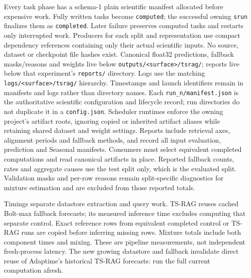 \documentclass[11pt,a4paper]{article}
\begin{document}
Every task phase has a schema-1 plain scientific manifest allocated before
expensive work. Fully written tasks become \texttt{computed}; the successful
owning \texttt{srun} finalizes them as \texttt{completed}. Later failure
preserves computed tasks and restarts only interrupted work. Producers for
each split and representation use compact dependency references containing
only their actual scientific inputs. No source, dataset or checkpoint file
hashes exist.
Canonical float32 predictions, fallback masks/reasons and weights live below
\texttt{outputs/<surface>/tsrag/}; reports live below that experiment's
\texttt{reports/} directory. Logs use the matching
\texttt{logs/<surface>/tsrag/} hierarchy. Timestamps and launch identifiers
remain in manifests and logs rather than directory names. Each
\texttt{run\_n/manifest.json} is the authoritative scientific configuration and
lifecycle record; run directories do not duplicate it in a
\texttt{config.json}. Scheduler runtimes enforce the owning project's
artifact roots, ignoring copied or inherited artifact aliases while retaining
shared dataset and weight settings. Reports include retrieval axes, alignment
periods and fallback methods, and record all input
evaluation, prediction and Seasonal manifests. Consumers must select equivalent
completed computations and read canonical artifacts in place.
Reported fallback counts, rates and aggregate causes use the test split only,
which is the evaluated split. Validation masks and per-row reasons remain
split-specific diagnostics for mixture estimation and are excluded from those
reported totals.

Timings separate datastore extraction and query work. TS-RAG reuses cached
Bolt-max fallback forecasts; its measured inference time excludes computing
that separate control. Exact reference rows from equivalent completed control
or TS-RAG runs are copied before inferring missing rows. Mixture totals include
both component times and mixing.
These are pipeline measurements, not independent fresh-process latency.
The new growing datastore and fallback invalidate direct reuse of Adaptime's
historical TS-RAG forecasts: run the full current computation afresh.
\end{document}
